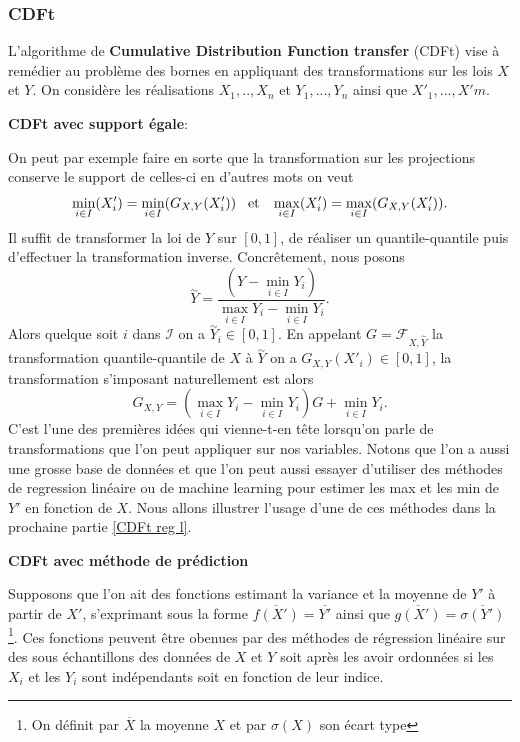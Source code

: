 \documentclass[a4paper,11pt]{article}
\begin{document}
\subsubsection{CDFt}
\label{CDf-t-algo}

L'algorithme de \textbf{Cumulative Distribution Function transfer} (CDFt) vise à remédier au problème des bornes en appliquant des transformations sur les lois $X$ et $Y$. On considère les réalisations $X_1,..,X_n$ et $Y_1,...,Y_n$ ainsi que $X'_{1},...,X'{m}$.

\vspace{0.7cm}

\noindent \textbf{CDFt avec support égale}:

On peut par exemple faire en sorte que la transformation sur les projections conserve le support de celles-ci en d'autres mots on veut
\[ \min_{i \in I}(X'_i)=\min_{i \in I}(G_{X,Y}(X'_i)) \hspace{3mm} \textrm{et} \hspace{3mm}  \max_{i \in I}(X'_i)=\max_{i \in I}(G_{X,Y}(X'_i)).\]
Il suffit de transformer la loi de $Y$ sur $[0,1]$, de réaliser un quantile-quantile puis d'effectuer la transformation inverse. Concrêtement, nous posons 
\[\overset{\sim}{Y}= \frac{(Y-\min_{i\in I}Y_i)}{\max_{i\in I}Y_i- \min_{i\in I}Y_i}.\]
Alors quelque soit $i$ dans $\mathcal{I}$ on a $\overset{\sim}{Y}_i \in [0,1]$. En appelant $G= \mathcal{F}_{X,\overset{\sim}{Y}}$ la transformation quantile-quantile de $X$ à $\overset{\sim}{Y}$ on a $G_{X,Y}(X'_i) \in [0,1]$, la transformation s'imposant naturellement est alors
\[ G_{X,Y}= (\max_{i\in I}Y_i- \min_{i\in I}Y_i)G + \min_{i\in I}Y_i.\]
C'est l'une des premières idées qui vienne-t-en tête lorsqu'on parle de transformations que l'on peut appliquer sur nos variables. Notons que l'on a aussi une grosse base de données et que l'on peut aussi essayer d'utiliser des méthodes de regression linéaire ou de machine learning pour estimer les max et les min de $Y'$ en fonction de $X$. Nous allons illustrer l'usage d'une de ces méthodes dans la prochaine partie \ref{CDFt reg l}.

\vspace{0.7cm}

\noindent \textbf{CDFt avec méthode de prédiction}
\label{CDFt reg l}

Supposons que l'on ait des fonctions estimant la variance et la moyenne de $Y'$ à partir de $X'$, s'exprimant sous la forme $\overline{f(X')} = \overline{Y'}$ ainsi que $\overline{g(X')} = \overline{\sigma(Y')}$ \footnote{On définit par $\overline{X}$ la  moyenne $X$ et par $\sigma(X)$ son écart type}. Ces fonctions peuvent être obenues par des méthodes de régression linéaire sur des sous échantillons des données de $X$ et $Y$ soit après les avoir ordonnées si les $X_i$ et les $Y_i$ sont indépendants soit en fonction de leur indice.
\end{document}

